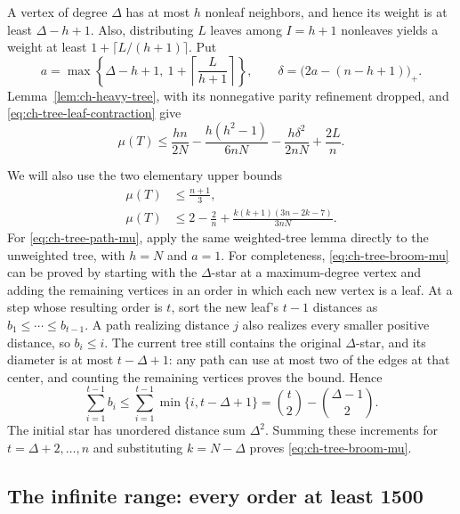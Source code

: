 \documentclass[11pt,a4paper]{article}
\theoremstyle{remark}
\numberwithin{equation}{section}
\begin{document}
A vertex of degree $\Delta$ has at most $h$ nonleaf neighbors, and hence
its weight is at least $\Delta-h+1$. Also, distributing $L$ leaves
among $I=h+1$ nonleaves yields a weight at least
$1+\lceil L/(h+1)\rceil$. Put
\begin{equation}\label{eq:ch-tree-heavy-a}
 a=\max\left\{\Delta-h+1,\ 1+\left\lceil\frac L{h+1}\right\rceil\right\},
 \qquad \delta=\bigl(2a-(n-h+1)\bigr)_+.
\end{equation}
Lemma~\ref{lem:ch-heavy-tree}, with its nonnegative parity refinement
dropped, and \eqref{eq:ch-tree-leaf-contraction} give
\begin{equation}\label{eq:ch-tree-core-mu}
 \mu(T)\le
 \frac{hn}{2N}-\frac{h(h^2-1)}{6nN}
                   -\frac{h\delta^2}{2nN}+\frac{2L}{n}.
\end{equation}

We will also use the two elementary upper bounds
\begin{align}
 \mu(T)&\le\frac{n+1}{3},\label{eq:ch-tree-path-mu}\\
 \mu(T)&\le2-\frac2n+
          \frac{k(k+1)(3n-2k-7)}{3nN}.
                                     \label{eq:ch-tree-broom-mu}
\end{align}
For \eqref{eq:ch-tree-path-mu}, apply the same weighted-tree lemma
directly to the unweighted tree, with $h=N$ and $a=1$.
For completeness, \eqref{eq:ch-tree-broom-mu} can be proved by starting
with the $\Delta$-star at a maximum-degree vertex and adding the remaining
vertices in an order in which each new vertex is a leaf. At a step whose
resulting order is $t$, sort the new leaf's $t-1$ distances as
$b_1\le\cdots\le b_{t-1}$. A path realizing distance $j$ also realizes
every smaller positive distance, so $b_i\le i$. The current tree still
contains the original $\Delta$-star, and its diameter is at most
$t-\Delta+1$: any path can use at most two of the edges at that center,
and counting the remaining vertices proves the bound. Hence
\[
 \sum_{i=1}^{t-1}b_i\le
 \sum_{i=1}^{t-1}\min\{i,t-\Delta+1\}
 =\binom t2-\binom{\Delta-1}{2}.
\]
The initial star has unordered distance sum $\Delta^2$. Summing these
increments for $t=\Delta+2,\ldots,n$ and substituting
$k=N-\Delta$ proves \eqref{eq:ch-tree-broom-mu}.

\subsection{The infinite range: every order at least 1500}
\end{document}
